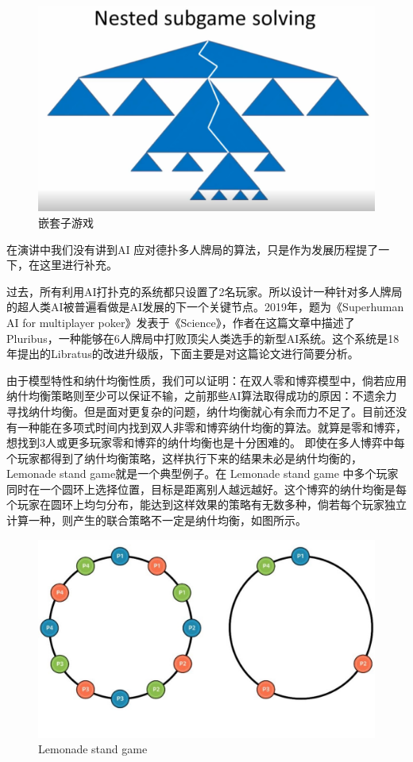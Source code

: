 \documentclass{article}
\begin{document}
\begin{figure}[h!]
	\centering
	\includegraphics[scale=0.5]{a}
	\caption{嵌套子游戏}
	\label{fig:universe}
\end{figure}
在演讲中我们没有讲到AI 应对德扑多人牌局的算法，只是作为发展历程提了一下，在这里进行补充。\par
过去，所有利用AI打扑克的系统都只设置了2名玩家。所以设计一种针对多人牌局的超人类AI被普遍看做是AI发展的下一个关键节点。2019年，题为《Superhuman AI for multiplayer poker》\citep{ff}发表于《Science》，作者在这篇文章中描述了 Pluribus，一种能够在6人牌局中打败顶尖人类选手的新型AI系统。这个系统是18年提出的Libratus的改进升级版，下面主要是对这篇论文进行简要分析。\par
由于模型特性和纳什均衡性质，我们可以证明：在双人零和博弈模型中，倘若应用纳什均衡策略则至少可以保证不输，之前那些AI算法取得成功的原因：不遗余力寻找纳什均衡。但是面对更复杂的问题，纳什均衡就心有余而力不足了。目前还没有一种能在多项式时间内找到双人非零和博弈纳什均衡的算法。就算是零和博弈，想找到3人或更多玩家零和博弈的纳什均衡也是十分困难的。
即使在多人博弈中每个玩家都得到了纳什均衡策略，这样执行下来的结果未必是纳什均衡的，Lemonade stand game就是一个典型例子\citep{gg}。在 Lemonade stand game 中多个玩家同时在一个圆环上选择位置，目标是距离别人越远越好。这个博弈的纳什均衡是每个玩家在圆环上均匀分布，能达到这样效果的策略有无数多种，倘若每个玩家独立计算一种，则产生的联合策略不一定是纳什均衡，如图所示。\par
\begin{figure}[h!]
	\centering
	\includegraphics[scale=0.5]{b}
	\caption{Lemonade stand game}
	\label{fig:universe}
\end{figure}
\end{document}
